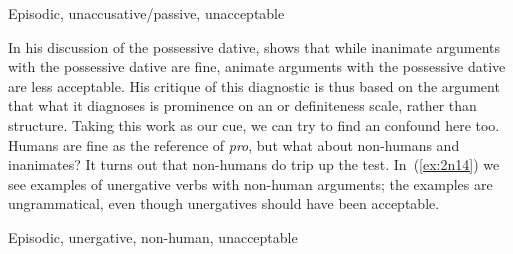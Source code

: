 \begin{exe}
\begin{xlist}
\begin{exe}
\begin{xlist}
\begin{exe}
\begin{xlist}
\begin{exe}
\begin{exe}
\begin{xlist}
\begin{exe}
\begin{xlist}
\begin{exe}
\begin{xlist}
\begin{exe}
\begin{xlist}
\begin{exe}
\begin{xlist}
\begin{exe}
\begin{xlist}
\begin{exe}
\begin{xlist}
\begin{exe}
\begin{xlist}
 \z
\z 

 \begin{exe}
 \ex  Episodic, unaccusative/passive, unacceptable \label{ex:2n13}
 \begin{xlist} 
	
	
 \z
\z 
		
In his discussion of the possessive dative, \cite{gafter14li} shows that while inanimate arguments with the possessive dative are fine, animate arguments with the possessive dative are less acceptable. His critique of this diagnostic is thus based on the argument that what it diagnoses is prominence on an  or definiteness scale, rather than structure. Taking this work as our cue, we can try to find an  confound here too. Humans are fine as the reference of \emph{pro}, but what about non-humans and inanimates? It turns out that non-humans do trip up the test. In~(\ref{ex:2n14}) we see examples of unergative verbs with non-human arguments; the examples are ungrammatical, even though unergatives should have been acceptable.

 \begin{exe}
 \ex  Episodic, unergative, non-human, unacceptable \label{ex:2n14}
 \begin{xlist} 
		

		
		


\end{xlist}
\end{exe}
\end{xlist}
\end{exe}
\end{xlist}
\end{exe}
\end{xlist}
\end{exe}
\end{xlist}
\end{exe}
\end{xlist}
\end{exe}
\end{xlist}
\end{exe}
\end{xlist}
\end{exe}
\end{xlist}
\end{exe}
\end{xlist}
\end{exe}
\end{exe}
\end{xlist}
\end{exe}
\end{xlist}
\end{exe}
\end{xlist}
\end{exe}
